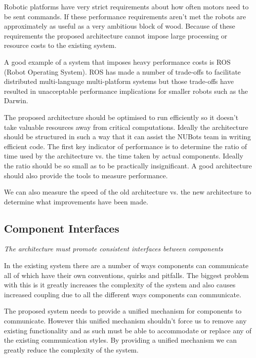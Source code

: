 \documentclass[english,12pt]{scrartcl}
\newcommand{\requirement}[1]{\textit{#1}}
\begin{document}
            Robotic platforms have very strict requirements about how often motors need to be sent
            commands. If these performance requirements aren't met the robots are approximately as
            useful as a very ambitious block of wood. Because of these requirements the proposed
            architecture cannot impose large processing or resource costs to the existing system.
            
            A good example of a system that imposes heavy performance costs is ROS (Robot Operating
            System). ROS has made a number of trade-offs to facilitate distributed multi-language
            multi-platform systems but those trade-offs have resulted in unacceptable performance
            implications for smaller robots such as the Darwin.
            
            The proposed architecture should be optimised to run efficiently so it doesn't take
            valuable resources away from critical computations. Ideally the architecture should be
            structured in such a way that it can assist the NUBots team in writing efficient code.
            The first key indicator of performance is to determine the ratio of time used by the
            architecture vs. the time taken by actual components. Ideally the ratio should be so
            small as to be practically insignificant. A good architecture should also provide the
            tools to measure performance.
            
            We can also measure the speed of the old architecture vs. the new architecture to
            determine what improvements have been made. 
        
        \subsection{Component Interfaces}
            \requirement{The architecture must promote consistent interfaces between components}
            
            In the existing system there are a number of ways components can communicate all of
            which have their own conventions, quirks and pitfalls. The biggest problem with this is
            it greatly increases the complexity of the system and also causes increased coupling due
            to all the different ways components can communicate.
            
            The proposed system needs to provide a unified mechanism for components to communicate.
            However this unified mechanism shouldn't force us to remove any existing functionality
            and as such must be able to accommodate or replace any of the existing communication
            styles. By providing a unified mechanism we can greatly reduce the complexity of the
            system.
            
\end{document}

